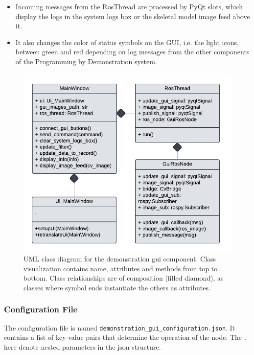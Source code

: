 \documentclass{CSSRforAfrica}
\begin{document}
\begin{itemize}
\begin{itemize}
        \item Incoming messages from the RosThread are processed by PyQt slots, which display the logs in the system logs box or the skeletal model image feed above it.
        \item It also changes the color of status symbols on the GUI, i.e. the light icons, between green and red depending on log messages from the other components of the Programming by Demonstration system. 
    \end{itemize}
\end{itemize}

\begin{figure}[htb]
    \centering
    \includegraphics[width=0.9\linewidth]{figures/gui.pdf}
    \caption{UML class diagram for the demonstration gui component. Class visualization contains name, attributes and methods from top to bottom. Class relationships are of composition (filled diamond), as classes where symbol ends instantiate the others as attributes.}
    \label{fig:guiuml}
\end{figure}


\subsubsection*{Configuration File}
The configuration file is named \texttt{demonstration\_gui\_configuration.json}. It contains a list of key-value pairs that determine the operation of the node. The \texttt{.} here denote nested parameters in the json structure.
\end{document}
